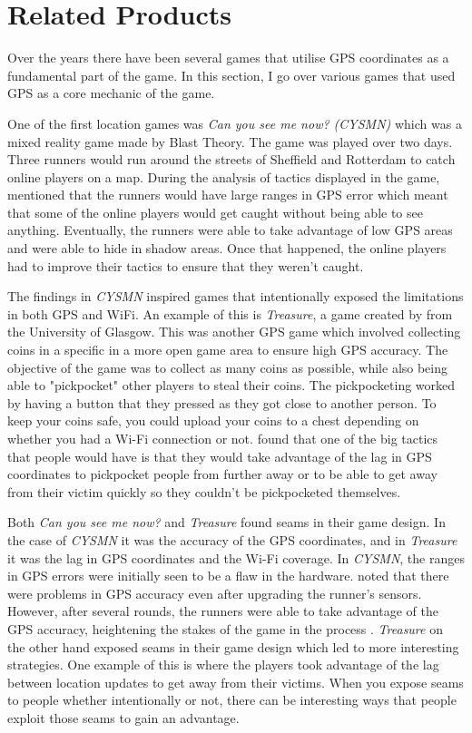 \documentclass{l4proj}
\begin{document}
\section{Related Products}
\label{relatedproducts}

Over the years there have been several games that utilise GPS coordinates as a fundamental part of the game. In this section, I go over various
games that used GPS as a core mechanic of the game.

One of the first location games was \emph{Can you see me now? (CYSMN)} which was a mixed reality game made by Blast Theory. \citep{canyouseeme} The
game was played over two days. Three runners would run around the streets of Sheffield
and Rotterdam to catch online players on a map. During the analysis of tactics displayed in the game,
\cite{canyouseeme} mentioned that the runners would have large ranges in GPS error which meant that some of the online players would get
caught without being able to see anything. Eventually, the runners were able to take advantage of low GPS areas and were able to hide in shadow
areas. Once that happened, the online players had to improve their tactics to ensure that they weren't caught.

The findings in \emph{CYSMN} inspired games that intentionally exposed the limitations in both GPS and WiFi. An example of this 
is \emph{Treasure}, a game created by \cite{Barkhuus2005} from the University of Glasgow. This was another GPS game which involved
collecting coins in a specific in a more open game area to ensure high GPS accuracy. The objective of the
game was to collect as many coins as possible, while also being able to "pickpocket" other players to steal their
coins. The pickpocketing worked by having a button that they pressed as they got close to another person. To keep your coins safe, you could upload your coins to a chest depending on whether you had a Wi-Fi connection or not. \cite{Barkhuus2005}
found that one of the big tactics that people would have is that they would take advantage of the lag in GPS coordinates
to pickpocket people from further away or to be able to get away from their victim quickly so they couldn't be
pickpocketed themselves.

Both \emph{Can you see me now?} and \emph{Treasure} found seams in their game design. In the case of \emph{CYSMN} it was the accuracy
of the GPS coordinates, and in \emph{Treasure} it was the lag in GPS coordinates and the Wi-Fi coverage. In \emph{CYSMN}, the ranges in GPS errors were initially seen
to be a flaw in the hardware. \cite{canyouseeme} noted that there were problems in GPS accuracy even after upgrading the runner's sensors. However, after several rounds, the runners were able to take advantage of the GPS accuracy,
heightening the stakes of the game in the process \citep{canyouseeme}. \emph{Treasure} on the other hand exposed seams
in their game design which led to more interesting strategies. One example of this is where the players took 
advantage of the lag between location updates to get away from their victims. \citep{Barkhuus2005} When you expose seams to people whether intentionally or not, there can
be interesting ways that people exploit those seams to gain an advantage.
\end{document}
